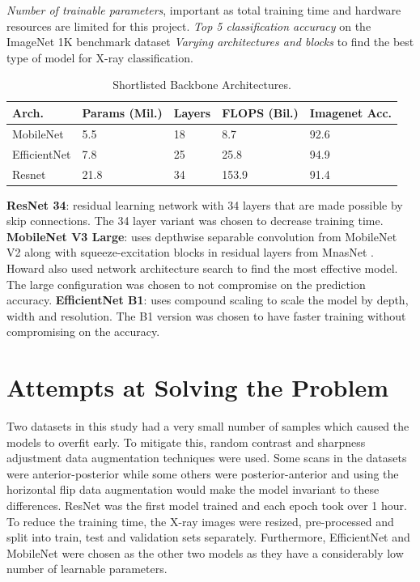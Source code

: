 \documentclass[10pt,twocolumn,letterpaper]{article}
\begin{document}
\textit{Number of trainable parameters}, important as total training time and hardware resources are limited for this project.
\textit{Top 5 classification accuracy} on the ImageNet 1K benchmark dataset 
\textit{Varying architectures and blocks} to find the best type of model for X-ray classification.
\begin{table}
  \centering
  \begin{tabular}{p{1.7cm}|p{1cm}|p{1cm}|p{1cm}|p{1cm}}
  \toprule
  Arch. & Params (Mil.) & Layers & FLOPS (Bil.) & Imagenet Acc.\\
  \midrule
  MobileNet & 5.5 & 18 & 8.7 & 92.6\\
  \midrule
  EfficientNet & 7.8 & 25 & 25.8 & 94.9\\
  \midrule
  Resnet & 21.8 & 34 & 153.9 & 91.4\\
  \bottomrule
  \end{tabular}
  \caption{Shortlisted Backbone Architectures.}
  \vspace{-1em}
  \label{tab:selArch}
\end{table}
\textbf{ResNet 34}: residual learning network with 34 layers that are made possible by skip connections. The 34 layer variant was chosen to decrease training time. \cite{he2016deep}
\textbf{MobileNet V3 Large}: uses depthwise separable convolution from MobileNet V2 \cite{sandler2018mobilenetv2} along with squeeze-excitation blocks in residual layers from MnasNet \cite{tan2019mnasnet}. Howard \etal \cite{howard2019searching} also used network architecture search to find the most effective model. The large configuration was chosen to not compromise on the prediction accuracy.
\textbf{EfficientNet B1}: uses compound scaling to scale the model by depth, width and resolution. The B1 version was chosen to have faster training without compromising on the accuracy. \cite{tan2019efficientnet}
\section{Attempts at Solving the Problem} 
\label{sec:method}
Two datasets in this study had a very small number of samples which caused the models to overfit early. To mitigate this, random contrast and sharpness adjustment \cite{nanni2021comparison} data augmentation techniques were used. Some scans in the datasets were anterior-posterior while some others were posterior-anterior and using the horizontal flip data augmentation would make the model invariant to these differences\cite{botev2022regularising}.
ResNet was the first model trained and each epoch took over 1 hour. To reduce the training time, the X-ray images were resized, pre-processed and split into train, test and validation sets separately. Furthermore, EfficientNet and MobileNet were chosen as the other two models as they have a considerably low number of learnable parameters. 
\end{document}
